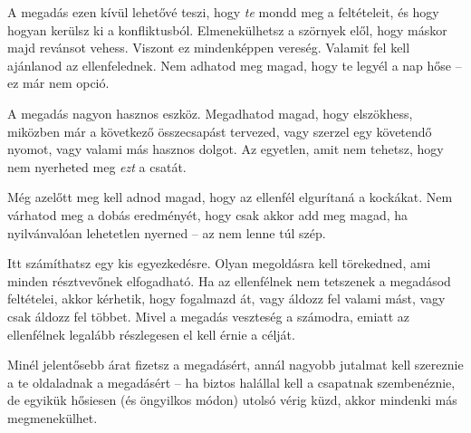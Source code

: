 A megadás ezen kívül lehetővé teszi, hogy \emph{te} mondd meg a feltételeit, és hogy hogyan kerülsz ki a konfliktusból. Elmenekülhetsz a szörnyek elől, hogy máskor majd revánsot vehess. Viszont ez mindenképpen vereség. Valamit fel kell ajánlanod az ellenfelednek. Nem adhatod meg magad, hogy te legyél a nap hőse -- ez már nem opció.

A megadás nagyon hasznos eszköz. Megadhatod magad, hogy elszökhess, miközben már a következő összecsapást tervezed, vagy szerzel egy követendő nyomot, vagy valami más hasznos dolgot. Az egyetlen, amit nem tehetsz, hogy nem nyerheted meg \emph{ezt} a csatát.

Még azelőtt meg kell adnod magad, hogy az ellenfél elgurítaná a kockákat. Nem várhatod meg a dobás eredményét, hogy csak akkor add meg magad, ha nyilvánvalóan lehetetlen nyerned -- az nem lenne túl szép.

Itt számíthatsz egy kis egyezkedésre. Olyan megoldásra kell törekedned, ami minden résztvevőnek elfogadható. Ha az ellenfélnek nem tetszenek a megadásod feltételei, akkor kérhetik, hogy fogalmazd át, vagy áldozz fel valami mást, vagy csak áldozz fel többet. Mivel a megadás veszteség a számodra, emiatt az ellenfélnek legalább részlegesen el kell érnie a célját.

Minél jelentősebb árat fizetsz a megadásért, annál nagyobb jutalmat kell szereznie a te oldaladnak a megadásért -- ha biztos halállal kell a csapatnak szembenéznie, de egyikük hősiesen (és öngyilkos módon) utolsó vérig küzd, akkor mindenki más megmenekülhet.
